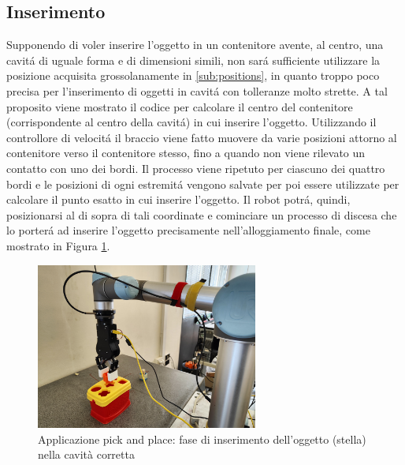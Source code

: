 \subsection{Inserimento} \label{sub:insertion}
Supponendo di voler inserire l'oggetto in un contenitore avente, al centro, una cavit\'{a} di uguale forma e di dimensioni simili, 
non sar\'{a} sufficiente utilizzare la posizione acquisita grossolanamente in \ref{sub:positions}, in quanto troppo poco precisa 
per l'inserimento di oggetti in cavit\'{a} con tolleranze molto strette. 
A tal proposito viene mostrato il codice per calcolare il centro del contenitore (corrispondente al 
centro della cavit\'{a}) in cui inserire l'oggetto\footnotemark{}. Utilizzando il controllore di velocit\'{a} il braccio viene fatto 
muovere da varie posizioni attorno al contenitore verso il contenitore stesso, fino a quando non viene rilevato un contatto con uno 
dei bordi. Il processo viene ripetuto per ciascuno dei quattro bordi e le posizioni di ogni estremit\'{a} vengono salvate per poi essere
utilizzate per calcolare il punto esatto in cui inserire l'oggetto. Il robot potr\'{a}, quindi, posizionarsi al di sopra di 
tali coordinate e cominciare un processo di discesa che lo porter\'{a} ad inserire l'oggetto precisamente nell'alloggiamento finale, 
come mostrato in Figura \ref{fig:insertion}. 
\newpage
\begin{figure}[H]
    \centering
    \includegraphics*[width=0.65\textwidth]{images/insertion.jpg}
    \caption{Applicazione pick and place: fase di inserimento dell'oggetto (stella) nella cavità corretta}
    \label{fig:insertion}
\end{figure}
